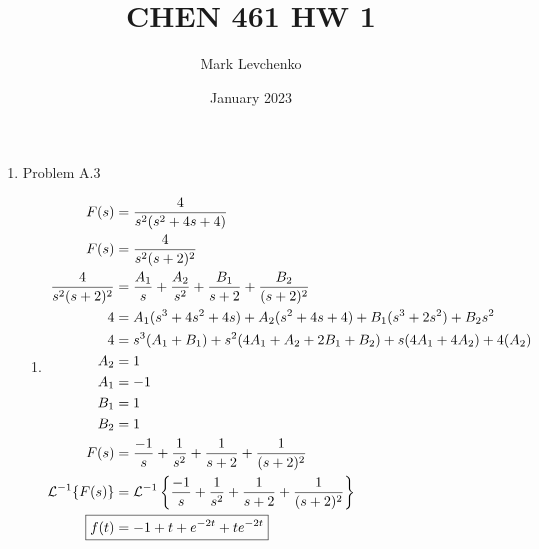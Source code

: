 \documentclass[12pt]{article}
\title{CHEN 461 HW 1}
\author{Mark Levchenko}
\date{January 2023}
\begin{document}
\begin{enumerate}
    \item Problem A.3
    \begin{enumerate}
        \item 
        \begin{align*}
            F(s) &= \frac{4}{s^2 (s^2 + 4s + 4)} \\
            F(s) &= \frac{4}{s^2 (s + 2)^2} \\
            \frac{4}{s^2 (s + 2)^2} &= \frac{A_1}{s} + \frac{A_2}{s^2} + \frac{B_1}{s+2} + \frac{B_2}{(s+2)^2} \\
            4 &= A_1 (s^3 + 4s^2 + 4s) + A_2 (s^2 + 4s + 4) + B_1 (s^3 + 2s^2) + B_2 s^2 \\
            4 &= s^3 (A_1 + B_1) + s^2 (4A_1 + A_2 + 2B_1 + B_2) + s (4A_1 + 4A_2) + 4(A_2) \\
            A_2 &= 1 \\
            A_1 &= -1 \\
            B_1 &= 1 \\
            B_2 &= 1 \\
            F(s) &= \frac{-1}{s} + \frac{1}{s^2} + \frac{1}{s+2} + \frac{1}{(s+2)^2} \\
            \mathcal{L}^{-1}\{F(s)\} &= \mathcal{L}^{-1} \left\{ \frac{-1}{s} + \frac{1}{s^2} + \frac{1}{s+2} + \frac{1}{(s+2)^2} \right\} \\
            \Aboxed{f(t) &= -1 + t + e^{-2t} + te^{-2t}}
        \end{align*}
    \end{enumerate}


\end{enumerate}
\end{document}
